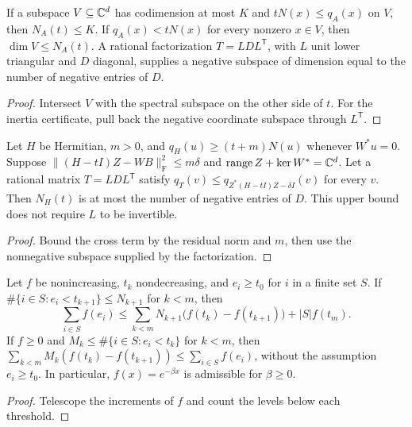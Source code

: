 \begin{lemma}
  \label{lem:spectral-counting}
  \leanok
  If a subspace \(V\subseteq\mathbb{C}^d\) has codimension at most \(K\) and
  \(tN(x)\le q_A(x)\) on \(V\), then \(N_A(t)\le K\).
  If \(q_A(x)<tN(x)\) for every nonzero \(x\in V\), then \(\dim V\le N_A(t)\).
  A rational factorization \(T=LDL^{\mathsf T}\), with \(L\) unit lower triangular and \(D\)
  diagonal, supplies a negative subspace of dimension equal to the number of negative entries
  of \(D\).
\end{lemma}
\begin{proof}
  \leanok
  Intersect \(V\) with the spectral subspace on the other side of \(t\).
  For the inertia certificate, pull back the negative coordinate subspace through \(L^{\mathsf T}\).
\end{proof}

\begin{lemma}
  \label{lem:spectral-schur}
  \leanok
  Let \(H\) be Hermitian, \(m>0\), and
  \(q_H(u)\ge(t+m)N(u)\) whenever \(W^*u=0\).
  Suppose
  \(\|(H-tI)Z-WB\|_{\mathrm F}^2\le m\delta\) and
  \(\operatorname{range}Z+\ker W^*=\mathbb{C}^d\).
  Let a rational matrix \(T=LDL^{\mathsf T}\) satisfy
  \(q_T(v)\le q_{Z^*(H-tI)Z-\delta I}(v)\) for every \(v\).
  Then \(N_H(t)\) is at most the number of negative entries of \(D\).
  This upper bound does not require \(L\) to be invertible.
\end{lemma}
\begin{proof}
  \leanok
  Bound the cross term by the residual norm and \(m\), then use the nonnegative subspace
  supplied by the factorization.
\end{proof}

\begin{lemma}
  \label{lem:spectral-trace-bins}
  \leanok
  Let \(f\) be nonincreasing, \(t_k\) nondecreasing, and \(e_i\ge t_0\) for \(i\) in a finite
  set \(S\).
  If \(\#\{i\in S:e_i<t_{k+1}\}\le N_{k+1}\) for \(k<m\), then
  \[
    \sum_{i\in S}f(e_i)\le
    \sum_{k<m}N_{k+1}\bigl(f(t_k)-f(t_{k+1})\bigr)+|S|f(t_m).
  \]
  If \(f\ge0\) and \(M_k\le\#\{i\in S:e_i<t_k\}\) for \(k<m\), then
  \(\sum_{k<m}M_k(f(t_k)-f(t_{k+1}))\le\sum_{i\in S}f(e_i)\), without the assumption \(e_i\ge t_0\).
  In particular, \(f(x)=e^{-\beta x}\) is admissible for \(\beta\ge0\).
\end{lemma}
\begin{proof}
  \leanok
  Telescope the increments of \(f\) and count the levels below each threshold.
\end{proof}

